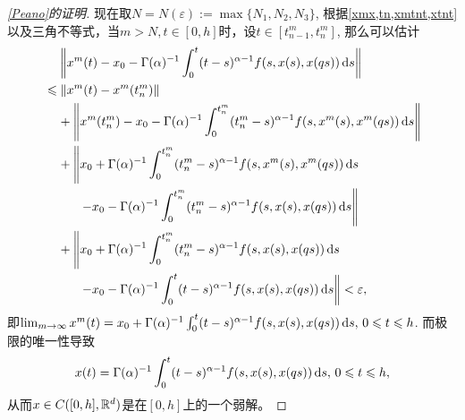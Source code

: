 \begin{proof}[\cref{Peano}的证明]
    现在取$N=N(\varepsilon):=\max \{N_1,N_2,N_3\}$, 根据\cref{xmx,tn,xmtnt,xtnt}以及三角不等式，当$m>N,t\in [0,h]$时，设$t\in \left[t^m_{n-1},t^m_n\right]$, 那么可以估计
    \begin{align*}
        &\relphantom{\leqslant}\left\|x^m(t)-x_0-\Gamma(\alpha)^{-1}\int_{0}^{t}(t-s)^{\alpha-1}f(s,x(s),x(qs))\differential s\right\|
        \\ &\leqslant \left\|x^m(t)-x^m(t^m_n)\right\|
        \\ &\relphantom{\leqslant}+\left\|x^m(t^m_n)-x_0-\Gamma(\alpha)^{-1}\int_{0}^{t^m_n}(t^m_n-s)^{\alpha-1}f(s,x^m(s),x^m(qs))\differential s\right\|
        \\ &\relphantom{\leqslant}+\left\|x_0+\Gamma(\alpha)^{-1}\int_{0}^{t^m_n}(t^m_n-s)^{\alpha-1}f(s,x^m(s),x^m(qs))\differential s\right.
        \\ &\relphantom{\leqslant+} \phantom{\left\|\right.} \left.-x_0-\Gamma(\alpha)^{-1}\int_{0}^{t^m_n}(t^m_n-s)^{\alpha-1}f(s,x(s),x(qs))\differential s\right\|
        \\ &\relphantom{\leqslant}+\left\|x_0+\Gamma(\alpha)^{-1}\int_{0}^{t^m_n}(t^m_n-s)^{\alpha-1}f(s,x(s),x(qs))\differential s\right.
        \\ &\relphantom{\leqslant+} \phantom{\left\|\right.} \left.-x_0-\Gamma(\alpha)^{-1}\int_{0}^{t}(t-s)^{\alpha-1}f(s,x(s),x(qs))\differential s\right\|
        <\varepsilon,
    \end{align*}
    即$\lim_{m\to \infty}x^m(t)=x_0+\Gamma(\alpha)^{-1}\int_{0}^{t}(t-s)^{\alpha-1}f(s,x(s),x(qs))\mathop{}\!\mathrm{d} s,\,\allowbreak 0\leqslant t\leqslant h$. 而极限的唯一性导致
    \begin{equation*}
        x(t)=\Gamma(\alpha)^{-1}\int_{0}^{t}(t-s)^{\alpha-1}f(s,x(s),x(qs))\mathop{}\!\mathrm{d} s,\,0\leqslant t\leqslant h,
    \end{equation*}
    从而$x\in C([0,h],\mathbb{R}^d)$是\mainEquation 在$[0,h]$上的一个弱解。
\end{proof}

